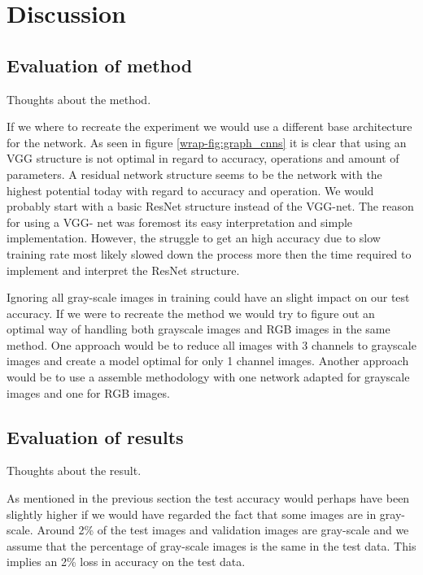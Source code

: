 \documentclass{kthreport}
\begin{document}

\section{Discussion}
\label{sec:Discussion}

\subsection{Evaluation of method}
Thoughts about the method.

If we where to recreate the experiment we would use a different base architecture for the network.
As seen in figure \ref{wrap-fig:graph_cnns} it is clear that using an VGG structure is not optimal in regard to accuracy, operations and amount of parameters.
A residual network structure seems to be the network with the highest potential today with regard to accuracy and operation.
We would probably start with a basic ResNet structure instead of the VGG-net.
The reason for using a VGG- net was foremost its easy interpretation and simple implementation. However, the struggle to get an high accuracy due to slow training rate most likely slowed down the process more then the time required to implement and interpret the ResNet structure.

Ignoring all gray-scale images in training could have an slight impact on our test accuracy. If we were to recreate the method we would try to figure out an optimal way of handling both grayscale images and RGB images in the same method. One approach would be to reduce all images with 3 channels to grayscale images and create a model optimal for only 1 channel images. Another approach would be to use a assemble methodology with one network adapted for grayscale images and one for RGB images.

\subsection{Evaluation of results}

Thoughts about the result.

As mentioned in the previous section the test accuracy would perhaps have been slightly higher if we would have regarded the fact that some images are in gray-scale. Around 2\% of the test images and validation images are gray-scale and we assume that the percentage of gray-scale images is the same in the test data. This implies an 2\% loss in accuracy on the test data.
\end{document}
